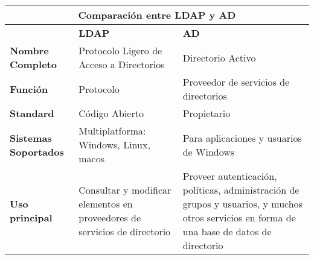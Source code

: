 
\begin{tabular}{ |p{4cm}||p{4cm}|p{4cm}| }
	\hline
	\multicolumn{3}{|c|}{\textbf{Comparación entre LDAP y AD}} \\
	\hline
	 &\textbf{LDAP}&\textbf{AD}\\
	\hline
	\textbf{Nombre Completo }  &  Protocolo Ligero de Acceso a Directorios  &Directorio Activo\\
	\hline
	\textbf{Función}& Protocolo&Proveedor de servicios de directorios\\
	\hline
	\textbf{Standard} &Código Abierto & Propietario\\
	\hline
	\textbf{Sistemas Soportados}&Multiplatforma: Windows, Linux, macos & Para aplicaciones y usuarios de Windows\\
	\hline
	\textbf{Uso principal}&   Consultar y modificar elementos en proveedores de servicios de directorio & Proveer autenticación, políticas, administración de grupos y usuarios, y muchos otros servicios en forma de una base de datos de directorio\\
	\hline
\end{tabular}